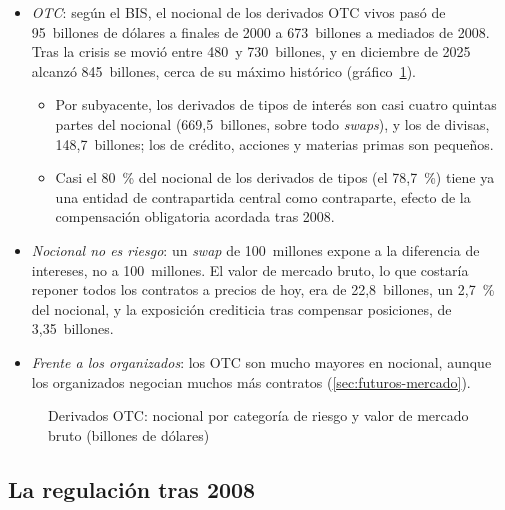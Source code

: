 \documentclass[11pt]{article}
\begin{document}
\begin{itemize}
\item \emph{OTC}: según el BIS, el nocional de los derivados OTC vivos pasó de 95~billones de dólares a finales de 2000 a 673~billones a mediados de 2008. Tras la crisis se movió entre 480~y 730~billones, y en diciembre de 2025 alcanzó 845~billones, cerca de su máximo histórico (gráfico~\ref{fig:bis-otc-derivados})\nocite{BIS2026OTCDerivados,ISDA2026KeyTrends}.
  \begin{itemize}
  \item Por subyacente, los derivados de tipos de interés son casi cuatro quintas partes del nocional (669,5~billones, sobre todo \emph{swaps}), y los de divisas, 148,7~billones; los de crédito, acciones y materias primas son pequeños\nocite{ISDA2026KeyTrends}.
  \item Casi el 80~\% del nocional de los derivados de tipos (el 78,7~\%) tiene ya una entidad de contrapartida central como contraparte, efecto de la compensación obligatoria acordada tras 2008\nocite{BIS2026OTCDerivados}.
  \end{itemize}
\item \emph{Nocional no es riesgo}: un \emph{swap} de 100~millones expone a la diferencia de intereses, no a 100~millones. El valor de mercado bruto, lo que costaría reponer todos los contratos a precios de hoy, era de 22,8~billones, un 2,7~\% del nocional, y la exposición crediticia tras compensar posiciones, de 3,35~billones\nocite{BIS2026OTCDerivados}.
\item \emph{Frente a los organizados}: los OTC son mucho mayores en nocional, aunque los organizados negocian muchos más contratos (\ref{sec:futuros-mercado}).
\end{itemize}

\begin{figure}[H]
\centering
\caption{Derivados OTC: nocional por categoría de riesgo y valor de mercado bruto (billones de dólares)}\label{fig:bis-otc-derivados}
\end{figure}

\subsection{La regulación tras 2008}\label{sec:mercados-regulacion}
\end{document}

